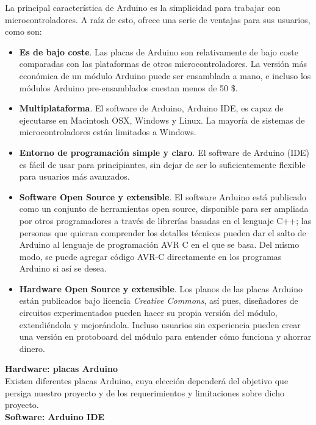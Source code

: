 \documentclass[12pt]{article}
\begin{document}
	\noindent La principal característica de Arduino es la simplicidad para trabajar con microcontroladores. A raíz de esto, ofrece una serie de ventajas para sus usuarios, como son:
	\begin{itemize}
		\item \textbf{Es de bajo coste}. Las placas de Arduino son relativamente de bajo coste comparadas con las plataformas de otros microcontroladores. La versión más económica de un módulo Arduino puede ser ensamblada a mano, e incluso los módulos Arduino pre-ensamblados cuestan menos de 50 \$.
		\item \textbf{Multiplataforma}. El software de Arduino, Arduino IDE, es capaz de ejecutarse en Macintosh OSX, Windows y Linux. La mayoría de sistemas de microcontroladores están limitados a Windows.
		\item  	\textbf{Entorno de programación simple y claro}. El software de Arduino (IDE) es fácil de usar para principiantes, sin dejar de ser lo suficientemente flexible para usuarios más avanzados.
		\item \textbf{Software Open Source y extensible}. El software Arduino está publicado como un conjunto de herramientas open source, disponible para ser ampliada por otros programadores a través de librerías basadas en el lenguaje C++; las personas que quieran comprender los detalles técnicos pueden dar el salto de Arduino al lenguaje de programación AVR C en el que se basa. Del mismo modo, se puede agregar código AVR-C directamente en los  programas Arduino si así se desea.
		\item \textbf{Hardware Open Source y extensible}. Los planos de las placas Arduino están publicados bajo licencia \textit{Creative Commons}, así pues, diseñadores de circuitos experimentados pueden hacer su propia versión del módulo, extendiéndola y mejorándola. Incluso usuarios sin experiencia pueden crear una versión en protoboard del módulo para entender cómo funciona y ahorrar dinero.
	
	\end{itemize}

	\noindent \textbf{\large Hardware: placas Arduino} \\
	
	\noindent Existen diferentes placas Arduino, cuya elección dependerá del objetivo que persiga nuestro proyecto y de los requerimientos y limitaciones sobre dicho proyecto. \\
	
	\noindent \textbf{\large Software: Arduino IDE}
	
\end{document}
